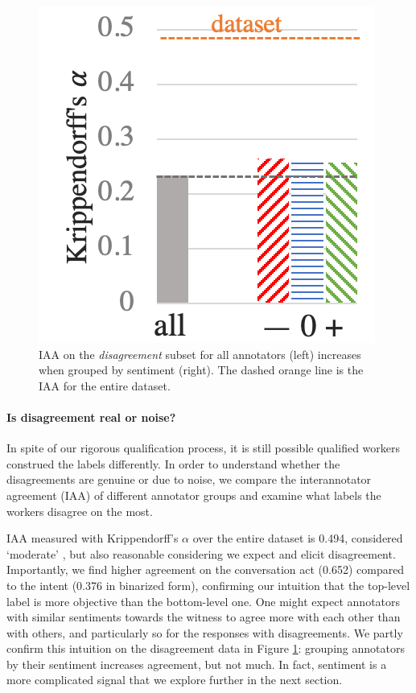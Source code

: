 \begin{figure}
\vspace{-1.2em}
\centering
\includegraphics[scale=0.4]{plots/subj_kripp_bar.pdf}
\vspace{-.3em}
  \caption{IAA on the \textit{disagreement} subset for all annotators (left) increases when grouped by sentiment (right). The dashed orange line is the IAA for the entire dataset.}
  \label{fig:subj_kripp}
\end{figure}

\paragraph{Is disagreement real or noise?} In spite of our rigorous qualification process, it is still possible qualified workers construed the labels differently. In order to understand whether the disagreements are genuine or due to noise, we compare the interannotator agreement (IAA) of different annotator groups and examine what labels the workers disagree on the most. 

IAA measured with Krippendorff's $\alpha$ over the entire dataset is 0.494, considered `moderate' \cite{Artstein:2008}, but also reasonable considering we expect and elicit disagreement. Importantly, we find higher agreement on the conversation act (0.652) compared to the intent (0.376 in binarized form), confirming our intuition that the top-level label is more objective than the bottom-level one. One might expect annotators with similar sentiments towards the witness to agree more with each other than with others, and particularly so for the responses with disagreements. We partly confirm this intuition on the disagreement data in Figure \ref{fig:subj_kripp}: grouping annotators by their sentiment increases agreement, but not much. In fact, sentiment is a more complicated signal that we explore further in the next section.  

